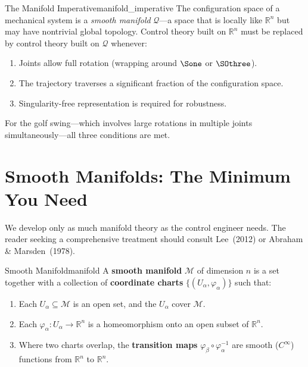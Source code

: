\documentclass[12pt, openany]{book}
\theoremstyle{plain}
\newcommand{\manifold}{\mathcal{M}}
\newcommand{\configspace}{\mathcal{Q}}
\newcommand{\Reals}{\mathbb{R}}
\begin{document}
\begin{keyidea}{The Manifold Imperative}{manifold_imperative}
  The configuration space of a mechanical system is a \emph{smooth manifold}
  $\configspace$---a space that is locally like $\Reals^n$ but may have
  nontrivial global topology. Control theory built on $\Reals^n$ must be
  replaced by control theory built on $\configspace$ whenever:
  \begin{enumerate}[label=(\roman*)]
    \item Joints allow full rotation (wrapping around $\Sone$ or $\SOthree$).
    \item The trajectory traverses a significant fraction of the configuration space.
    \item Singularity-free representation is required for robustness.
  \end{enumerate}
  For the golf swing---which involves large rotations in multiple joints
  simultaneously---all three conditions are met.
\end{keyidea}

\section{Smooth Manifolds: The Minimum You Need}

We develop only as much manifold theory as the control engineer needs. The
reader seeking a comprehensive treatment should consult Lee~(2012) or
Abraham \& Marsden~(1978).

\begin{definition}{Smooth Manifold}{manifold}
  A \textbf{smooth manifold} $\manifold$ of dimension $n$ is a set together
  with a collection of \textbf{coordinate charts}
  $\{(U_\alpha, \varphi_\alpha)\}$ such that:
  \begin{enumerate}[label=(\roman*)]
    \item Each $U_\alpha \subseteq \manifold$ is an open set, and the
      $U_\alpha$ cover $\manifold$.
    \item Each $\varphi_\alpha: U_\alpha \to \Reals^n$ is a homeomorphism
      onto an open subset of $\Reals^n$.
    \item Where two charts overlap, the \textbf{transition maps}
      $\varphi_\beta \circ \varphi_\alpha^{-1}$ are smooth
      ($C^\infty$) functions from $\Reals^n$ to $\Reals^n$.
  \end{enumerate}
\end{definition}
\end{document}
